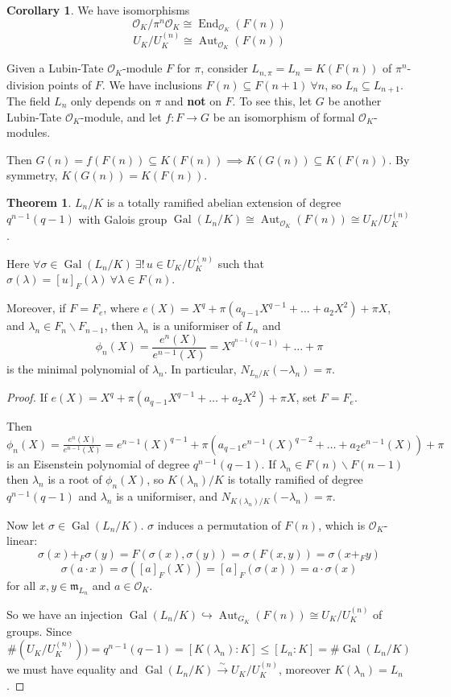 \documentclass[a4paper]{article}
\theoremstyle{definition}
\theoremstyle{default}
\newtheorem{theorem}[definition]{Theorem}
\newtheorem{corollary}[definition]{Corollary}
\theoremstyle{remark}
\DeclareMathOperator{\Aut}{Aut}
\DeclareMathOperator{\Gal}{Gal}
\DeclareMathOperator{\End}{End}
\begin{document}
\begin{corollary}
	We have isomorphisms
	$$\mathcal{O}_K/\pi^n\mathcal{O}_K \cong \End_{\mathcal{O}_K}(F(n))$$
	$$U_K/U_K^{(n)} \cong \Aut_{\mathcal{O}_K}(F(n))$$
\end{corollary}

Given a Lubin-Tate $\mathcal{O}_K$-module $F$ for $\pi$,
consider $L_{n, \pi} = L_n = K(F(n))$
of $\pi^n$-division points of $F$.
We have inclusions $F(n) \subseteq F(n+1)\ \forall n$,
so $L_n \subseteq L_{n+1}$.
The field $L_n$ only depends on $\pi$ and \textbf{not} on $F$.
To see this, let $G$ be another Lubin-Tate $\mathcal{O}_K$-module,
and let $f: F \to G$ be an isomorphism of formal $\mathcal{O}_K$-modules.

Then $G(n) = f(F(n)) \subseteq K(F(n)) \implies K(G(n)) \subseteq K(F(n))$. By symmetry, $K(G(n)) = K(F(n))$.

\begin{theorem}
	$L_n/K$ is a totally ramified abelian extension of degree $q^{n-1}(q-1)$
	with Galois group $\Gal(L_n/K) \cong \Aut_{\mathcal{O}_K}(F(n)) \cong U_K/U_K^{(n)}$.
	
	Here $\forall \sigma \in \Gal(L_n/K)\ \exists!\, u \in U_K/U_K^{(n)}$ such that
	$\sigma(\lambda)=[u]_F(\lambda)\ \forall \lambda \in F(n)$.
	
	Moreover, if $F=F_e$, where $e(X)=X^q + \pi(a_{q-1}X^{q-1} + \dots + a_2X^2)+ \pi X$,
	and $\lambda_n \in F_n \backslash F_{n-1}$,
	then $\lambda_n$ is a uniformiser of $L_n$ and 
	$$\phi_n(X) = \frac{e^n(X)}{e^{n-1}(X)} = X^{q^{n-1}(q-1)} + \dots + \pi$$
	is the minimal polynomial of $\lambda_n$.
	In particular, $N_{L_n/K}(-\lambda_n)=\pi$.
\end{theorem}
\begin{proof}
	If $e(X) = X^q + \pi(a_{q-1}X^{q-1} + \dots + a_2X^2) + \pi X$, set $F=F_e$.
	
	Then $\phi_n(X) = \frac{e^n(X)}{e^{n-1}(X)} = e^{n-1}(X)^{q-1}+\pi(a_{q-1}e^{n-1}(X)^{q-2} + \dots + a_2 e^{n-1}(X)) + \pi$
	is an Eisenstein polynomial of degree $q^{n-1}(q-1)$.
	If $\lambda_n \in F(n)\backslash F(n-1)$
	then $\lambda_n$ is a root of $\phi_n(X)$,
	so $K(\lambda_n)/K$ is totally ramified of degree $q^{n-1}(q-1)$
	and $\lambda_n$ is a uniformiser, and $N_{K(\lambda_n)/K}(-\lambda_n)=\pi$.
	
	Now let $\sigma \in \Gal(L_n/K)$.
	$\sigma$ induces a permutation of $F(n)$,
	which is $\mathcal{O}_K$-linear:
	$$\sigma(x) +_F \sigma(y) = F(\sigma(x), \sigma(y)) = \sigma(F(x, y)) = \sigma(x +_F y)$$
	$$\sigma(a \cdot x) = \sigma([a]_F(X)) = [a]_F(\sigma(x)) = a \cdot \sigma(x)$$
	for all $x,y \in \mathfrak{m}_{L_n}$ and $a \in \mathcal{O}_K$.
	
	So we have an injection $\Gal(L_n/K) \hookrightarrow \Aut_{G_K}(F(n)) \cong U_K/U_K^{(n)}$
	of groups. Since
	$$\#(U_K/U_K^{(n)})) = q^{n-1}(q-1) = [K(\lambda_n):K] \leq [L_n : K] = \# \Gal(L_n/K)$$
	we must have equality and $\Gal(L_n/K) \overset{\sim}{\longrightarrow} U_K/U_K^{(n)}$,
	moreover $K(\lambda_n)=L_n$.
\end{proof}
\end{document}
